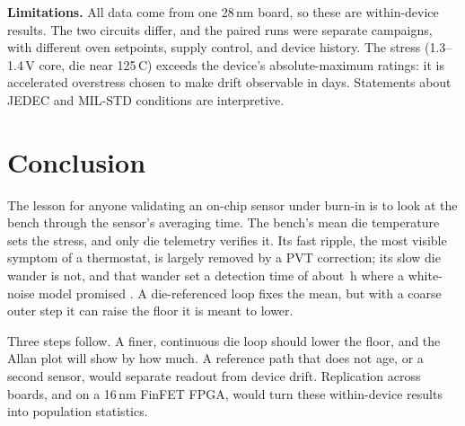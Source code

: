 \documentclass[10pt,twocolumn]{article}
\newcommand{\degC}{\,\textdegree C}
\begin{document}
\textbf{Limitations.} All data come from one 28\,nm board, so these are within-device results. The two circuits differ, and the paired runs were separate campaigns, with different oven setpoints, supply control, and device history. The stress (1.3--1.4\,V core, die near 125\degC) exceeds the device's absolute-maximum ratings: it is accelerated overstress chosen to make drift observable in days. Statements about JEDEC and MIL-STD conditions are interpretive.


\section{Conclusion}

The lesson for anyone validating an on-chip sensor under burn-in is to look at the bench through the sensor's averaging time. The bench's mean die temperature sets the stress, and only die telemetry verifies it. Its fast ripple, the most visible symptom of a thermostat, is largely removed by a PVT correction; its slow die wander is not, and that wander set a detection time of about \vWstar\,h where a white-noise model promised \vTminBound. A die-referenced loop fixes the mean, but with a coarse outer step it can raise the floor it is meant to lower.

Three steps follow. A finer, continuous die loop should lower the floor, and the Allan plot will show by how much. A reference path that does not age, or a second sensor, would separate readout from device drift. Replication across boards, and on a 16\,nm FinFET FPGA, would turn these within-device results into population statistics.
\end{document}
